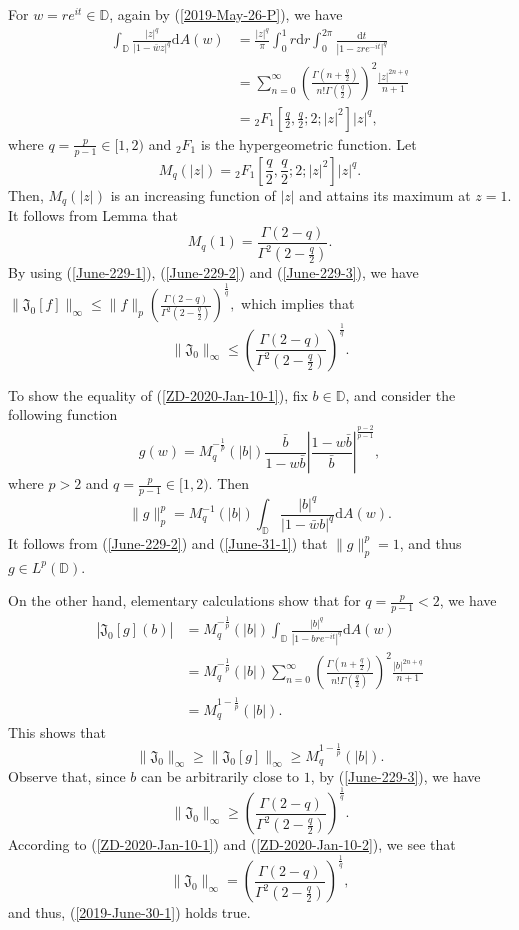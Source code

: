 \documentclass[a4paper,12pt]{amsart}
\makeatletter
\theoremstyle{definition}
\numberwithin{equation}{section}
\newcounter{tmp}
\newcounter{tmp2}
\newcommand{\Ref}[1]{\@ifundefined{r@#1}{}{\setcounter{tmp}{\ref{#1}}\Alph{tmp}}}
\newcommand{\ID}{{\mathbb D}}
\def\be{\begin{equation}}
\def\ee{\end{equation}}
\makeatother
\begin{document}
For $w=re^{it}\in\ID$, again by (\ref{2019-May-26-P}),  we have
\begin{align}\label{June-229-2}
\int_{\ID}\frac{|z|^q}{|1-\bar{w}z|^q}\mathrm{d}A(w) &=\frac{|z|^q}{\pi}\int_0^1r\mathrm{d}r\int_0^{2\pi}\frac{\mathrm{d}t}{|1-{z}re^{-it}|^q}\\ \nonumber
&=\sum\limits_{n=0}^{\infty}\left(\frac{\Gamma(n+\frac{q}{2})}{n!\Gamma(\frac{q}{2})}\right)^2\frac{|z|^{2n+q}}{n+1}\\ \nonumber
&= {}_2F_1\left[\frac{q}{2}, \frac{q}{2};2;|z|^{2}\right]|z|^q,
\end{align}
where $q=\frac{p}{p-1}\in[1, 2)$ and ${}_2F_1$ is the hypergeometric function.
Let
\be\label{June-31-1}M_q(|z|)={}_2F_1\left[\frac{q}{2}, \frac{q}{2};2;|z|^{2}\right]|z|^q.\ee
Then, $M_q(|z|)$ is an increasing function of $|z|$ and attains its maximum at $z=1$.
It follows from Lemma \Ref{DZ-2019-lemma-B} that
\be\label{June-229-3} M_q(1)=\frac{\Gamma(2-q)}{\Gamma^2\left(2-\frac{q}{2}\right)}.\ee
By using (\ref{June-229-1}), (\ref{June-229-2}) and (\ref{June-229-3}),
we have
$\|\mathfrak{J}_0[f]\|_{\infty}\leq \|f\|_{p} \left(\frac{\Gamma(2-q)}{\Gamma^2(2-\frac{q}{2})}\right)^{\frac{1}{q}},$
which implies that
\be\label{ZD-2020-Jan-10-1}\|\mathfrak{J}_0\|_{\infty}\leq\left(\frac{\Gamma(2-q)}{\Gamma^2(2-\frac{q}{2})}\right)^{\frac{1}{q}}.\ee


To show the equality of (\ref{ZD-2020-Jan-10-1}), fix $b\in\ID$, and consider the following function
$$g(w)=M_q^{-\frac{1}{p}}(|b|)\frac{\bar{b}}{1-w\bar{b}}\left|\frac{1-w\bar{b}}{\bar{b}}\right|^{\frac{p-2}{p-1}},$$
where $p>2$ and $q=\frac{p}{p-1}\in[1, 2)$.
Then
$$\|g\|_{p}^p=M_q^{-1}(|b|)\int_{\ID}\frac{|b|^q}{|1-\bar{w}b|^q}\mathrm{d}A(w) .$$
It follows from  (\ref{June-229-2}) and (\ref{June-31-1}) that
$\|g\|_{p}^p=1$, and thus $g\in L^p(\ID)$.

On the other hand, elementary calculations show that for $q=\frac{p}{p-1}<2$, we have
\begin{align*}
|\mathfrak{J}_0[g](b)|&=M_q^{-\frac{1}{p}}(|b|)\int_{\ID}\frac{|b|^q}{|1-{b}re^{-it}|^q}\mathrm{d}A(w) \\ \nonumber
&=M_q^{-\frac{1}{p}}(|b|)\sum\limits_{n=0}^{\infty}\left(\frac{\Gamma(n+\frac{q}{2})}{n!\Gamma(\frac{q}{2})}\right)^2\frac{|b|^{2n+q}}{n+1}\\ \nonumber
&=M_q^{1-\frac{1}{p}}(|b|).
\end{align*}
This shows that
$$\|\mathfrak{J}_0\|_{\infty}\geq\|\mathfrak{J}_0[g]\|_{\infty}\geq M_q^{1-\frac{1}{p}}(|b|).$$
Observe that, since $b$ can be arbitrarily close to $1$, by (\ref{June-229-3}), we have
\be\label{ZD-2020-Jan-10-2}\|\mathfrak{J}_0\|_{\infty}\geq \left(\frac{\Gamma(2-q)}{\Gamma^2(2-\frac{q}{2})}\right)^{\frac{1}{q}}.\ee
According to (\ref{ZD-2020-Jan-10-1}) and (\ref{ZD-2020-Jan-10-2}), we see that
$$\|\mathfrak{J}_0\|_{\infty}=\left(\frac{\Gamma(2-q)}{\Gamma^2\left(2-\frac{q}{2}\right)}\right)^{\frac{1}{q}},$$
and thus, (\ref{2019-June-30-1}) holds true.
\end{document}
